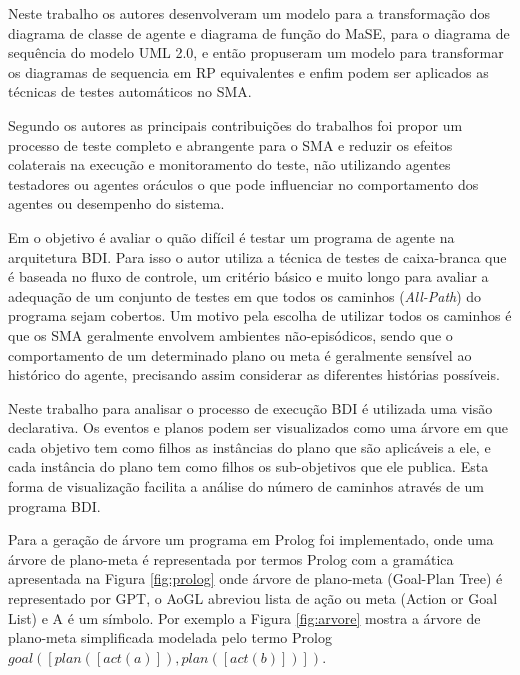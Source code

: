 Neste trabalho os autores desenvolveram um modelo para a transformação dos diagrama de classe de agente e diagrama de função do MaSE, para o diagrama de sequência do modelo UML 2.0, e então propuseram um modelo para transformar os diagramas de sequencia em RP equivalentes e enfim podem ser aplicados as técnicas de testes automáticos no SMA.

Segundo os autores as principais contribuições do trabalhos foi propor um processo de teste completo e abrangente para o SMA e reduzir os efeitos colaterais na execução e monitoramento do teste, não utilizando agentes testadores ou agentes oráculos o que pode influenciar no comportamento dos agentes ou desempenho do sistema.


Em \cite{winikoff2014testability} o objetivo é avaliar o quão difícil é testar um programa de agente na arquitetura BDI. Para isso o autor utiliza a técnica de testes de caixa-branca que é baseada no fluxo de controle, um critério básico e muito longo para avaliar a adequação de um conjunto de testes em que todos os caminhos (\textit{All-Path}) do programa sejam cobertos. Um motivo pela escolha de utilizar todos os caminhos é que os SMA geralmente envolvem ambientes não-episódicos, sendo que o comportamento de um determinado plano ou meta é geralmente sensível ao histórico do agente, precisando assim considerar as diferentes histórias possíveis.

Neste trabalho para analisar o processo de execução BDI é utilizada uma visão declarativa. Os eventos e planos podem ser visualizados como uma árvore em que cada objetivo tem como filhos as instâncias do plano que são aplicáveis a ele, e cada instância do plano tem como filhos os sub-objetivos que ele publica. Esta forma de visualização facilita a análise do número de caminhos através de um programa BDI.

Para a geração de árvore um programa em Prolog foi implementado, onde uma árvore de plano-meta é representada por termos Prolog com a gramática apresentada na Figura \ref{fig:prolog} onde árvore de plano-meta (Goal-Plan Tree) é representado por GPT, o AoGL abreviou lista de ação ou meta (Action or Goal List) e A é um símbolo. Por exemplo a Figura \ref{fig:arvore} mostra a árvore de plano-meta simplificada modelada pelo termo Prolog \begin{math} goal\left ( \left [ plan\left ( \left [ act\left ( a \right ) \right ] \right ),plan\left ( \left [ act\left ( b \right ) \right ] \right ) \right ] \right )\end{math}.

